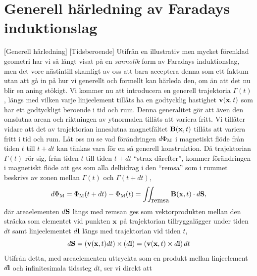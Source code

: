 {{{{\section{Generell h{\"a}rledning av Faradays induktionslag}
[Generell h{\"a}rledning]
[Tidsberoende]
Utifr{\aa}n en illustrativ men mycket f{\"o}renklad geometri har vi s{\aa}
l{\aa}ngt visat p{\aa} en {\it sannolik} form av Faradays induktionslag, men
det vore n{\"a}stintill skamligt av oss att bara acceptera denna som ett faktum
utan att g{\aa} in p{\aa} hur vi generellt och formellt kan h{\"a}rleda den,
om {\"a}n att det nu blir en aning st{\"o}kigt. Vi kommer nu att introducera
en generell trajektoria $\Gamma(t)$, l{\"a}ngs med vilken varje linjeelement
till{\aa}ts ha en godtycklig hastighet ${\bf v}({\bf x},t)$ som har ett
godtyckligt beroende i tid och rum. Denna generalitet g{\"o}r att {\"a}ven den
omslutna arean och riktningen av ytnormalen till{\aa}ts att variera fritt.
Vi till{\aa}ter vidare att det av trajektorian inneslutna magnetf{\"a}ltet
${\bf B}({\bf x},t)$ till{\aa}ts att variera fritt i tid och
rum.
\noindent
L{\aa}t oss nu se vad f{\"o}r{\"a}ndringen $d\Phi_{\rm M}$ i magnetiskt fl{\"o}de
fr{\aa}n tiden $t$ till $t+dt$ kan t{\"a}nkas vara f{\"o}r en s{\aa} generell
konstruktion.
D{\aa} trajektorian $\Gamma(t)$ r{\"o}r sig, fr{\aa}n tiden $t$ till tiden
$t+dt$ ``strax d{\"a}refter'', kommer f{\"o}r{\"a}ndringen i magnetiskt
fl{\"o}de att ges som alla delbidrag i den ``remsa'' som i rummet beskrivs
av zonen mellan $\Gamma(t)$ och $\Gamma(t+dt)$,
$$
  d\Phi_{\rm M}=\Phi_{\rm M}(t+dt)-\Phi_{\rm M}(t)
    =\iint_{\hbox{remsa}}{\bf B}({\bf x},t)\cdot d{\bf S},
$$
d{\"a}r areaelementen $d{\bf S}$ l{\"a}ngs med remsan ges som vektorprodukten
mellan den str{\"a}cka som elementet vid punkten ${\bf x}$ p{\aa} trajektorian
tillryggal{\"a}gger under tiden $dt$ samt linjeelementet $d{\bf l}$ l{\"a}ngs
med trajektorian vid tiden $t$,
$$
  d{\bf S}=({\bf v}({\bf x},t)dt)\times(d{\bf l})
    =({\bf v}({\bf x},t)\times d{\bf l})\,dt
$$
Utifr{\aa}n detta, med areaelementen uttryckta som en produkt mellan
linjeelement $d{\bf l}$ och infinitesimala tidssteg $dt$, ser vi direkt att
}}}}
